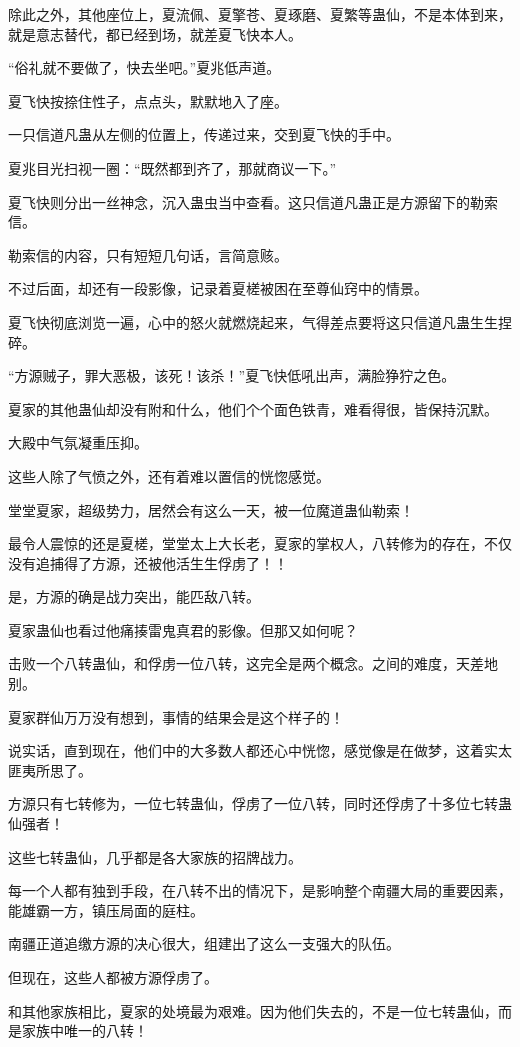 \begin{this_body}
除此之外，其他座位上，夏流佩、夏擎苍、夏琢磨、夏繁等蛊仙，不是本体到来，就是意志替代，都已经到场，就差夏飞快本人。

“俗礼就不要做了，快去坐吧。”夏兆低声道。

夏飞快按捺住性子，点点头，默默地入了座。

一只信道凡蛊从左侧的位置上，传递过来，交到夏飞快的手中。

夏兆目光扫视一圈：“既然都到齐了，那就商议一下。”

夏飞快则分出一丝神念，沉入蛊虫当中查看。这只信道凡蛊正是方源留下的勒索信。

勒索信的内容，只有短短几句话，言简意赅。

不过后面，却还有一段影像，记录着夏槎被困在至尊仙窍中的情景。

夏飞快彻底浏览一遍，心中的怒火就燃烧起来，气得差点要将这只信道凡蛊生生捏碎。

“方源贼子，罪大恶极，该死！该杀！”夏飞快低吼出声，满脸狰狞之色。

夏家的其他蛊仙却没有附和什么，他们个个面色铁青，难看得很，皆保持沉默。

大殿中气氛凝重压抑。

这些人除了气愤之外，还有着难以置信的恍惚感觉。

堂堂夏家，超级势力，居然会有这么一天，被一位魔道蛊仙勒索！

最令人震惊的还是夏槎，堂堂太上大长老，夏家的掌权人，八转修为的存在，不仅没有追捕得了方源，还被他活生生俘虏了！！

是，方源的确是战力突出，能匹敌八转。

夏家蛊仙也看过他痛揍雷鬼真君的影像。但那又如何呢？

击败一个八转蛊仙，和俘虏一位八转，这完全是两个概念。之间的难度，天差地别。

夏家群仙万万没有想到，事情的结果会是这个样子的！

说实话，直到现在，他们中的大多数人都还心中恍惚，感觉像是在做梦，这着实太匪夷所思了。

方源只有七转修为，一位七转蛊仙，俘虏了一位八转，同时还俘虏了十多位七转蛊仙强者！

这些七转蛊仙，几乎都是各大家族的招牌战力。

每一个人都有独到手段，在八转不出的情况下，是影响整个南疆大局的重要因素，能雄霸一方，镇压局面的庭柱。

南疆正道追缴方源的决心很大，组建出了这么一支强大的队伍。

但现在，这些人都被方源俘虏了。

和其他家族相比，夏家的处境最为艰难。因为他们失去的，不是一位七转蛊仙，而是家族中唯一的八转！


\end{this_body}
